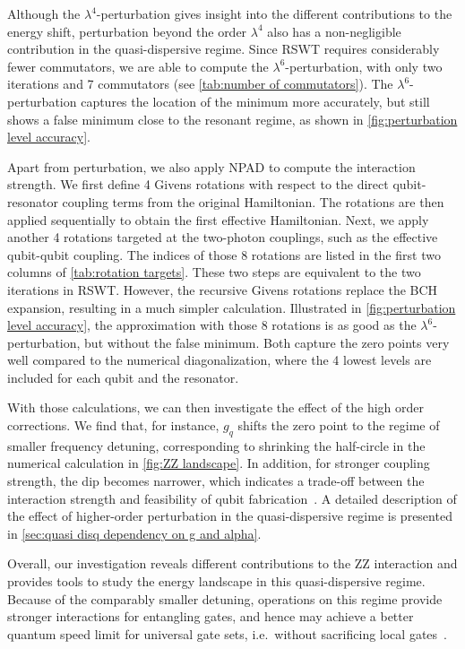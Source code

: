 \documentclass[%
 reprint,
 amsmath,amssymb,
 aps,
pra,
noeprint,
superscriptaddress,
]{revtex4-2}
\begin{document}
Although the $\lambda^4$-perturbation gives insight into the different contributions to the energy shift, perturbation beyond the order $\lambda^4$ also has a non-negligible contribution in the quasi-dispersive regime.
Since RSWT requires considerably fewer commutators, we are able to compute the $\lambda^6$-perturbation, with only two iterations and 7 commutators (see \cref{tab:number of commutators}).
The $\lambda^6$-perturbation captures the location of the minimum more accurately, but still shows a false minimum close to the resonant regime, as shown in \cref{fig:perturbation level accuracy}.

Apart from perturbation, we also apply NPAD to compute the interaction strength.
We first define 4 Givens rotations with respect to the direct qubit-resonator coupling terms from the original Hamiltonian.
The rotations are then applied sequentially to obtain the first effective Hamiltonian.
Next, we apply another 4 rotations targeted at the two-photon couplings, such as the effective qubit-qubit coupling.
The indices of those 8 rotations are listed in the first two columns of \cref{tab:rotation targets}.
These two steps are equivalent to the two iterations in RSWT.
However, the recursive Givens rotations replace the BCH expansion, resulting in a much simpler calculation.
Illustrated in \cref{fig:perturbation level accuracy}, the approximation with those 8 rotations is as good as the $\lambda^6$-perturbation, but without the false minimum.
Both capture the zero points very well compared to the numerical diagonalization, where the 4 lowest levels are included for each qubit and the resonator.

With those calculations, we can then investigate the effect of the high order corrections.
We find that, for instance, $g_q$ shifts the zero point to the regime of smaller frequency detuning, corresponding to shrinking the half-circle in the numerical calculation in \cref{fig:ZZ landscape}.
In addition, for stronger coupling strength, the dip becomes narrower, which indicates a trade-off between the interaction strength and feasibility of qubit fabrication~\cite{Hertzberg2020}.
A detailed description of the effect of higher-order perturbation in the quasi-dispersive regime is presented in \cref{sec:quasi disq dependency on g and alpha}.

Overall, our investigation reveals different contributions to the ZZ interaction and provides tools to study the energy landscape in this quasi-dispersive regime.
Because of the comparably smaller detuning, operations on this regime provide stronger interactions for entangling gates, and hence may achieve a better quantum speed limit for universal gate sets, i.e.~without sacrificing local gates~\cite{Goerz2017}.
\end{document}
